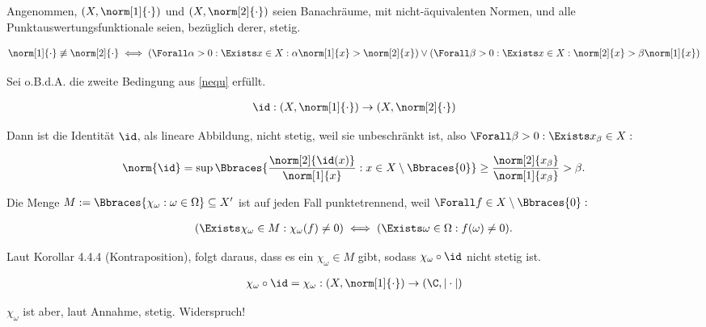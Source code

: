 \begin{solution}

Angenommen, $(X, \norm[1]{\cdot})$ und $(X, \norm[2]{\cdot})$ seien Banachräume, mit nicht-äquivalenten Normen, und alle Punktauswertungsfunktionale seien, bezüglich derer, stetig.

\begin{align}
\label{nequ}
  \norm[1]{\cdot} \not \equiv \norm[2]{\cdot}
  \iff
  (
    \Forall \alpha > 0:
    \Exists x \in X:
    \alpha \norm[1]{x} > \norm[2]{x}
  )
  \lor
  (
    \Forall \beta > 0:
    \Exists x \in X:
    \norm[2]{x} > \beta \norm[1]{x}
  )
\end{align}

Sei o.B.d.A. die zweite Bedingung aus \eqref{nequ} erfüllt.

\begin{align*}
  \id:
  (X, \norm[1]{\cdot})
  \to
  (X, \norm[2]{\cdot})
\end{align*}

Dann ist die Identität $\id$, als lineare Abbildung, nicht stetig, weil sie unbeschränkt ist, also $\Forall \beta > 0: \Exists x_\beta \in X:$

\begin{align*}
  \norm{\id}
  =
  \sup \Bbraces
  {
    \frac{\norm[2]{\id(x)}}{\norm[1]{x}}:
    x \in X \setminus \Bbraces{0}
  }
  \geq
  \frac{\norm[2]{x_\beta}}{\norm[1]{x_\beta}}
  >
  \beta.
\end{align*}

Die Menge $M := \Bbraces{\chi_\omega: \omega \in \Omega} \subseteq X^\prime$ ist auf jeden Fall punktetrennend, weil $\Forall f \in X \setminus \Bbraces{0}:$

\begin{align*}
  (
    \Exists \chi_\omega \in M:
    \chi_\omega(f) \neq 0
  )
  \iff
  (
    \Exists \omega \in \Omega:
    f(\omega) \neq 0
  ).
\end{align*}

Laut Korollar 4.4.4 (Kontraposition), folgt daraus, dass es ein $\chi_\omega \in M$ gibt, sodass $\chi_\omega \circ \id$ nicht stetig ist.

\begin{align*}
  \chi_\omega \circ \id
  =
  \chi_\omega:
  (X, \norm[1]{\cdot}) \to (\C, |\cdot|)
\end{align*}

$\chi_\omega$ ist aber, laut Annahme, stetig. Widerspruch!

\end{solution}
